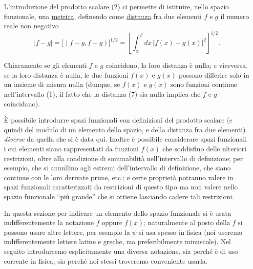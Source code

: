 \documentclass[11pt, a4paper]{book}
\numberwithin{equation}{section}
\begin{document}
L'introduzione del prodotto scalare (2) ci permette di istituire, nello
spazio funzionale, una \underline{metrica}, definendo come
\underline{distanza} fra due elementi $f$ e $g$ il numero reale non
negativo
\begin{equation}
|f-g| = \bigl[(f-g,f-g)\bigr]^{1/2}
= \left[\int_\alpha^\beta dx\,|f(x)-g(x)|^2\right]^{1/2}.
\end{equation}

Chiaramente se gli elementi $f$ e $g$ coincidono, la loro distanza è
nulla; e viceversa, se la loro distanza è nulla, le due funzioni $f(x)$
e $g(x)$ possono differire solo in un insieme di misura nulla (dunque,
se $f(x)$ e $g(x)$ sono funzioni continue nell'intervallo (1), il fatto
che la distanza (7) sia nulla implica che $f$ e $g$ coincidano).

È possibile introdurre spazi funzionali con definizioni del prodotto
scalare (e quindi del modulo di un elemento dello spazio, e della
distanza fra due elementi) \emph{diverse} da quella che si è data qui.
Inoltre è possibile considerare spazi funzionali i cui elementi siano
rappresentati da funzioni $f(x)$ che soddisfino delle ulteriori
restrizioni, oltre alla condizione di sommabilità nell'intervallo di
definizione; per esempio, che si annullino agli estremi dell'intervallo
di definizione, che siano continue con le loro derivate prime, etc.; e
certe proprietà potranno valere in spazi funzionali caratterizzati da
restrizioni di questo tipo ma non valere nello spazio funzionale ``più
grande'' che si ottiene lasciando cadere tali restrizioni.

In questa sezione per indicare un elemento dello spazio funzionale si
è usata indifferentemente la notazione $f$ oppure $f(x)$; naturalmente
al posto della $f$ si possono usare altre lettere, per esempio la $\psi$
si usa spesso in fisica (noi useremo indifferentemente lettere latine e
greche, ma preferibilmente minuscole). Nel seguito introdurremo
esplicitamente una diversa notazione, sia perché è di uso corrente in
fisica, sia perché noi stessi troveremo conveniente usarla.
\end{document}
